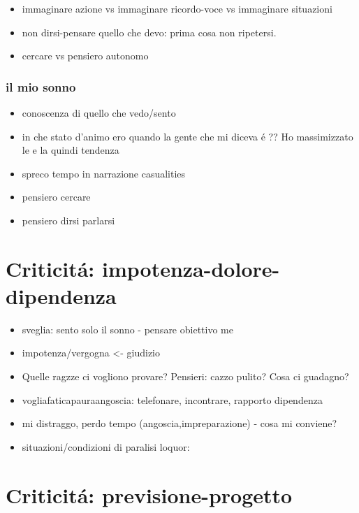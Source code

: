 \begin{itemize}
\item immaginare azione vs immaginare ricordo-voce vs immaginare situazioni
\item non dirsi-pensare quello che devo: prima cosa non ripetersi.
\item cercare vs pensiero autonomo
\end{itemize}

\subsection{il mio sonno}

\begin{itemize}
\item conoscenza di quello che vedo/sento
\item in che stato d'animo ero quando  la gente che mi diceva \'e  ?? 
Ho massimizzato le  e la quindi tendenza 
\item spreco tempo in narrazione casualities
\item pensiero cercare
\item pensiero dirsi parlarsi
\end{itemize}

{\let\clearpage\relax
\chapter{Criticit\'a: impotenza-dolore-dipendenza }
}

\begin{itemize}
\item sveglia: sento solo il sonno - pensare obiettivo me
\item impotenza/vergogna <- giudizio
\item Quelle ragzze ci vogliono provare? Pensieri: cazzo pulito? Cosa ci guadagno?
\item vogliafaticapauraangoscia: telefonare, incontrare, rapporto dipendenza
\item mi distraggo, perdo tempo (angoscia,impreparazione) - cosa mi conviene?
\item situazioni/condizioni di paralisi loquor: 
\end{itemize}

{\let\clearpage\relax
\chapter{Criticit\'a: previsione-progetto}
}

